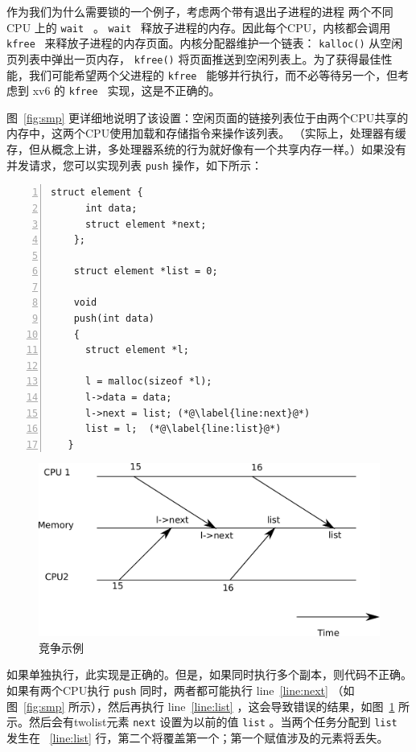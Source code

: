 作为我们为什么需要锁的一个例子，考虑两个带有退出子进程的进程
 两个不同 CPU 上的  {    \tt    wait   } 。  {    \tt    wait   }  释放子进程的内存。因此每个CPU，内核都会调用 {    \tt    kfree   } 来释放子进程的内存页面。内核分配器维护一个链表：   \lstinline{kalloc()}           从空闲页列表中弹出一页内存，   \lstinline{kfree()}   
     将页面推送到空闲列表上。为了获得最佳性能，我们可能希望两个父进程的  {    \tt    kfree   }  能够并行执行，而不必等待另一个，但考虑到 xv6 的  {    \tt    kfree   }  实现，这是不正确的。  

图~\ref{fig:smp}   更详细地说明了该设置：空闲页面的链接列表位于由两个CPU共享的内存中，这两个CPU使用加载和存储指令来操作该列表。 （实际上，处理器有缓存，但从概念上讲，多处理器系统的行为就好像有一个共享内存一样。）如果没有并发请求，您可以实现列表    \lstinline{push}    操作，如下所示：
    \begin{lstlisting}[numbers=left,firstnumber=1]
    struct element {
      int data;
      struct element *next;
    };
    
    struct element *list = 0;
    
    void
    push(int data)
    {
      struct element *l;
   
      l = malloc(sizeof *l);
      l->data = data;
      l->next = list; (*@\label{line:next}@*)
      list = l;  (*@\label{line:list}@*)
   }
\end{lstlisting}     

   \begin{figure}[t]
\center
\includegraphics[scale=0.5]{fig/race.pdf}
\caption{竞争示例  }
\label{fig:race}
\end{figure}    如果单独执行，此实现是正确的。但是，如果同时执行多个副本，则代码不正确。如果有两个CPU执行
    \lstinline{push}    同时，两者都可能执行 line~\ref{line:next}    （如图~\ref{fig:smp}    所示），然后再执行 line~\ref{line:list}    ，这会导致错误的结果，如图~\ref{fig:race}    所示。然后会有twolist元素
    \lstinline{next}    设置为以前的值
    \lstinline{list}   。当两个任务分配到
    \lstinline{list}    发生在 ~\ref{line:list}    行，第二个将覆盖第一个；第一个赋值涉及的元素将丢失。  

